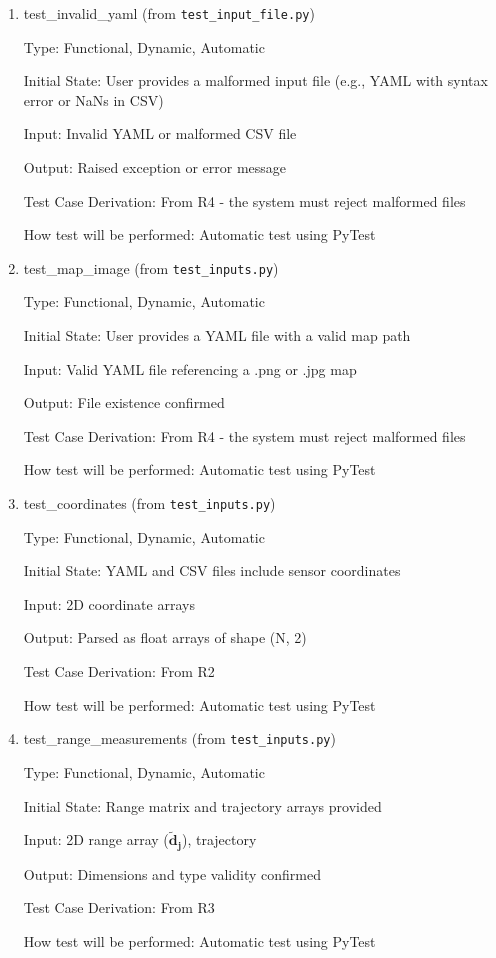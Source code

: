 \documentclass[12pt, titlepage]{article}
\begin{document}
\begin{enumerate}

\item{test\_invalid\_yaml (from \texttt{test\_input\_file.py})\\}

Type: Functional, Dynamic, Automatic
					
Initial State: User provides a malformed input file (e.g., YAML with syntax error or NaNs in CSV)
					
Input: Invalid YAML or malformed CSV file
					
Output: Raised exception or error message

Test Case Derivation: From R4 - the system must reject malformed files

How test will be performed: Automatic test using PyTest
					
\item{test\_map\_image (from \texttt{test\_inputs.py})\\}

Type: Functional, Dynamic, Automatic
					
Initial State: User provides a YAML file with a valid map path
					
Input: Valid YAML file referencing a .png or .jpg map
					
Output: File existence confirmed

Test Case Derivation: From R4 - the system must reject malformed files

How test will be performed: Automatic test using PyTest

\item{test\_coordinates (from \texttt{test\_inputs.py})\\}

Type: Functional, Dynamic, Automatic
					
Initial State: YAML and CSV files include sensor coordinates
					
Input: 2D coordinate arrays
					
Output: Parsed as float arrays of shape (N, 2)

Test Case Derivation: From R2

How test will be performed: Automatic test using PyTest

\item{test\_range\_measurements (from \texttt{test\_inputs.py})\\}

Type: Functional, Dynamic, Automatic
					
Initial State: Range matrix and trajectory arrays provided
					
Input: 2D range array ($\mathbf{\tilde{d}_j}$), trajectory
					
Output: Dimensions and type validity confirmed

Test Case Derivation: From R3

How test will be performed: Automatic test using PyTest
    
\end{enumerate}
\end{document}
